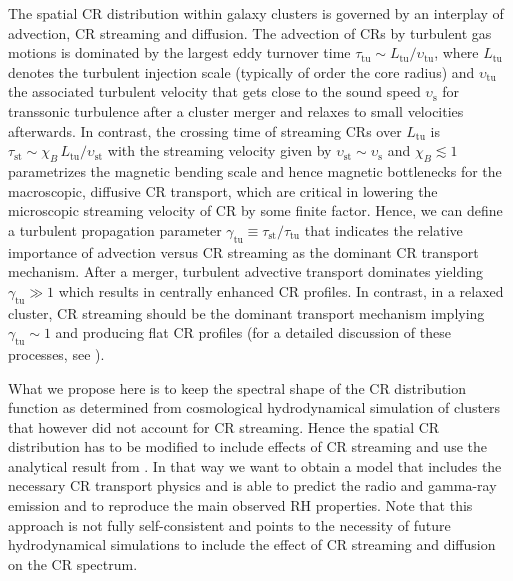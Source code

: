 \documentclass[traditabstract]{aa}
\newcommand{\rmn}{\mathrm}
\newcommand{\vel}{\upsilon}
\begin{document}
The spatial CR distribution within galaxy clusters is governed by an interplay
of advection, CR streaming and diffusion. The advection of CRs by turbulent gas
motions is dominated by the largest eddy turnover time $\tau_{\rmn{tu}}\sim
L_{\rmn{tu}}/ \vel_{\rmn{tu}}$, where $L_{\rmn{tu}}$ denotes the turbulent
injection scale (typically of order the core radius) and $\vel_{\rmn{tu}}$ the
associated turbulent velocity that gets close to the sound speed
$\vel_{\rmn{s}}$ for transsonic turbulence after a cluster merger and relaxes to
small velocities afterwards. In contrast, the crossing time of streaming CRs
over $L_{\rmn{tu}}$ is $\tau_{\rmn{st}}\sim \chi_B\,L_{\rmn{tu}}/
\vel_{\rmn{st}}$ with the streaming velocity given by $\vel_{\rmn{st}}\sim
\vel_{\rmn{s}}$ and $\chi_B\lesssim 1$ parametrizes the magnetic bending scale
and hence magnetic bottlenecks for the macroscopic, diffusive CR transport,
which are critical in lowering the microscopic streaming velocity of CR by some
finite factor. Hence, we can define a turbulent propagation parameter
$\gamma_{\rmn{tu}}\equiv \tau_{\rmn{st}}/\tau_{\rmn{tu}}$ that indicates the
relative importance of advection versus CR streaming as the dominant CR
transport mechanism. After a merger, turbulent advective transport dominates
yielding $\gamma_{\rmn{tu}}\gg 1$ which results in centrally enhanced CR
profiles. In contrast, in a relaxed cluster, CR streaming should be the dominant
transport mechanism implying $\gamma_{\rmn{tu}}\sim1$ and producing flat CR
profiles (for a detailed discussion of these processes, see
\citealp{2011A&A...527A..99E}).

What we propose here is to keep the spectral shape of the CR distribution
function as determined from cosmological hydrodynamical simulation of clusters
\citep{2010MNRAS.409..449P} that however did not account for CR streaming. Hence
the spatial CR distribution has to be modified to include effects of CR
streaming and use the analytical result from \citet{2011A&A...527A..99E}. In
that way we want to obtain a model that includes the necessary CR transport
physics and is able to predict the radio and gamma-ray emission and to reproduce
the main observed RH properties.  Note that this approach is not fully
self-consistent and points to the necessity of future hydrodynamical simulations
to include the effect of CR streaming and diffusion on the CR spectrum.
\end{document}
